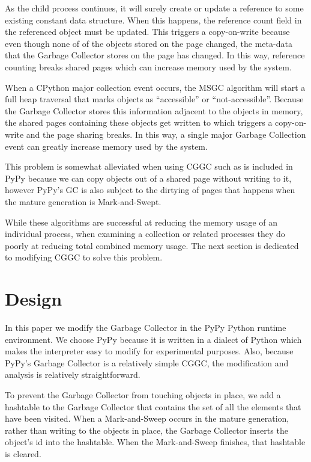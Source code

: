 \documentclass{article}
\begin{document}
As the child process continues, it will surely create or update a reference to some existing constant data structure.  When this happens, the reference count field in the referenced object must be updated.  This triggers a copy-on-write because even though none of of the objects stored on the page changed, the meta-data that the Garbage Collector stores on the page has changed.  In this way, reference counting breaks shared pages which can increase memory used by the system.

When a CPython major collection event occurs, the MSGC algorithm will start a full heap traversal that marks objects as ``accessible'' or ``not-accessible''.  Because the Garbage Collector stores this information adjacent to the objects in memory, the shared pages containing these objects get written to which triggers a copy-on-write and the page sharing breaks.  In this way, a single major Garbage Collection event can greatly increase memory used by the system.

This problem is somewhat alleviated when using CGGC such as is included in PyPy because we can copy objects out of a shared page without writing to it, however PyPy's GC is also subject to the dirtying of pages that happens when the mature generation is Mark-and-Swept.  

While these algorithms are successful at reducing the memory usage of an individual process, when examining a collection or related processes they do poorly at reducing total combined memory usage.  The next section is dedicated to modifying CGGC to solve this problem.  

\section{Design}\label{sec:design}

In this paper we modify the Garbage Collector in the PyPy Python runtime environment.  We choose PyPy because it is written in a dialect of Python which makes the interpreter easy to modify for experimental purposes.  Also, because PyPy's Garbage Collector is a relatively simple CGGC, the modification and analysis is relatively straightforward.  

To prevent the Garbage Collector from touching objects in place, we add a hashtable to the Garbage Collector that contains the set of all the elements that have been visited.  When a Mark-and-Sweep occurs in the mature generation, rather than writing to the objects in place, the Garbage Collector inserts the object's id into the hashtable.  When the Mark-and-Sweep finishes, that hashtable is cleared.  
\end{document}
